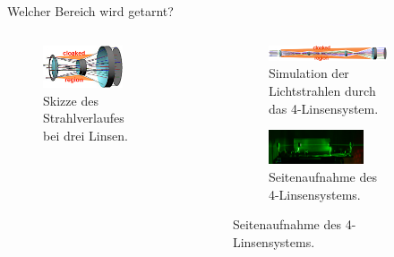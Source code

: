 \begin{frame}{Welcher Bereich wird getarnt?}
    \begin{columns}
        \begin{column}{0.3\textwidth}
            \begin{figure}
                \centering
                \includegraphics[width=0.8\textwidth]{images/3linsen-skizze.png}
                \caption{Skizze des Strahlverlaufes\\ bei drei Linsen.}
            \end{figure}
        \end{column}
        \begin{column}{0.69\textwidth}
            \begin{figure}
                \centering
                \begin{subfigure}{\textwidth}
                    \centering
                    \caption{Simulation der Lichtstrahlen durch das 4-Linsensystem.}
                    \includegraphics[width=\textwidth]{images/skizze.png}
                \end{subfigure}
                \begin{subfigure}{\textwidth}
                    \centering
                    \caption{Seitenaufnahme des 4-Linsensystems.}
                    \includegraphics[width=0.8\textwidth]{images/laser-seite.jpg}
                \end{subfigure}
            \end{figure}

        \end{column}
    \end{columns}

\end{frame}
